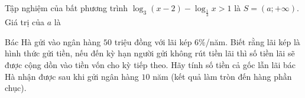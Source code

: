 \begin{ex}%
	Tập nghiệm của bất phương trình $\log_3 (x-2)-\log_{\tfrac{1}{3}}x>1$ là $S=(a;+\infty)$. Giá trị của $a$ là 
\end{ex}

\begin{ex}%
	Bác Hà gửi vào ngân hàng $50$ triệu đồng với lãi kép $6\%$/năm. Biết rằng lãi kép là hình thức gửi tiền, nếu đến kỳ hạn người gửi không rút tiền lãi thì số tiền lãi sẽ được cộng dồn vào tiền vốn cho kỳ tiếp theo.  Hãy tính số tiền cả gốc lẫn lãi bác Hà nhận được sau khi gửi ngân hàng $10$ năm (kết quả làm tròn đến hàng phần chục).
\end{ex}

